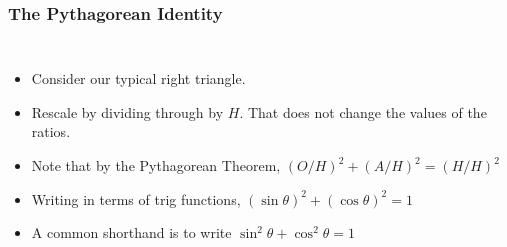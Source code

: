 \documentclass[serif,ignorenonframetext]{beamer}
\begin{document}
\begin{frame}
  \frametitle{The Pythagorean Identity}
  \begin{columns}
  \begin{itemize}[<+->]
  \item Consider our typical right triangle.
  \item Rescale by dividing through by $H$.  That does not change the
    values of the ratios.
  \item Note that by the Pythagorean Theorem, $(O/H)^2 + (A/H)^2 = (H/H)^2$
  \item Writing in terms of trig functions, $(\sin\theta)^2 +
    (\cos\theta)^2 =1$
  \item A common shorthand is to write $\sin^2 \theta + \cos^2\theta =1$
  \end{itemize}
  \end{columns}
\end{frame}
\end{document}
